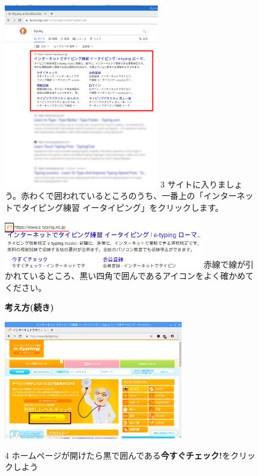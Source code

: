 \documentclass[a4paper,12pt]{jarticle}
\begin{document}
\begin{figure}[t]
  \begin{minipage}{6.582cm}
    \includegraphics[width=6.796cm]{textbook-img086.png}
    3 サイトに入りましょう。赤わくで囲われているところのうち、一番上の「インターネットでタイピング練習 イータイピング」をクリックします。
  \end{minipage}
  \begin{minipage}{8.482cm}
    \includegraphics[width=8.714cm]{textbook-img085.png}
    赤線で線が引かれているところ、黒い四角で囲んであるアイコンをよく確かめてください。
  \end{minipage}






  \centering



\end{figure}
\clearpage

\begin{figure}
  \textbf{考え方(続き)}



  \centering

  \includegraphics[width=0.7\textwidth]{textbook-img087.png}


  \begin{minipage}{0.7\textwidth}
    4 ホームページが開けたら黒で囲んである\textbf{今すぐチェック!}をクリックしよう

  \end{minipage}
\end{figure}
\end{document}
